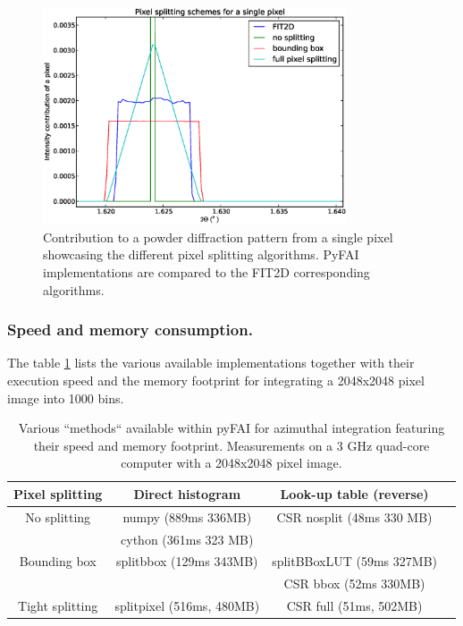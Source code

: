 \documentclass{iucr}
\begin{document}
\begin{figure}
\label{split}
\begin{center}
\includegraphics[width=9cm]{splitpixel.eps}
\caption{Contribution to a powder diffraction pattern from a single pixel
showcasing the different pixel splitting algorithms. PyFAI implementations are
compared to the FIT2D corresponding algorithms.}
\end{center}
\end{figure}

\subsubsection{Speed and memory consumption.}

The table \ref{table_methods}  lists the various available implementations
together with their execution speed and the memory footprint for integrating a 2048x2048
pixel image into 1000 bins.

\begin{table}
\label{table_methods}
\caption{Various ``methods`` available within pyFAI for azimuthal integration
featuring their speed and memory footprint. Measurements on a 3 GHz quad-core
computer with a 2048x2048 pixel image.}
\begin{tabular}[pos]{c|c|c|c}
Pixel splitting			& Direct histogram 		& Look-up table (reverse) \\
\hline
No splitting          & numpy (889ms 336MB)  &CSR nosplit (48ms 330 MB)\\ 
					  & cython (361ms 323 MB) & \\
\hline
Bounding box          & splitbbox (129ms 343MB) & splitBBoxLUT (59ms 327MB)\\
					&						&	CSR bbox (52ms 330MB) \\
\hline
Tight splitting & splitpixel (516ms, 480MB) &CSR full (51ms, 502MB)\\
\end{tabular}
\end{table}
\end{document}
